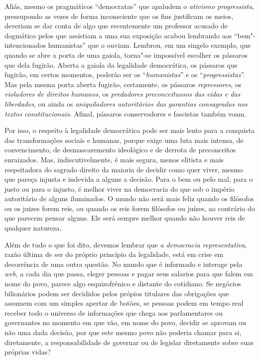 Aliás, mesmo os pragmáticos ``democratas'' que apaludem o \emph{ativismo
progressista,} pressupondo as vezes de forma inconsciente que os fins
justificam os meios, deveriam se dar conta de algo que recentemente um
professor acusado de dogmático pelos que assistiam a uma sua exposição
acabou lembrando aos ``bem"-intencionados humanistas'' que o ouviam.
Lembrou, em um singelo exemplo, que quando se abre a porta de uma
gaiola, torna"-se impossível escolher os pássaros que dela fugirão.
Aberta a gaiola da legalidade democrática, os pássaros que fugirão, em
certos momentos, poderão ser os ``\emph{humanistas}'' e os
``\emph{progressistas}''. Mas pela mesma porta aberta fugirão,
certamente, os pássaros \emph{repressores}, os \emph{violadores de
direitos humanos}, os \emph{predadores preconceituosos das vidas e das
liberdades}, ou ainda os \emph{aniquiladores autoritários das garantias
consagradas nos textos constitucionais}. Afinal, pássaros conservadores
e fascistas também voam.

Por isso, o respeito à legalidade democrática pode ser mais lento para a
conquista das transformações sociais e humanas, porque exige uma luta
mais intensa, de convencimento, de desmascaremento ideológico e de
derrota de preconceitos enraizados. Mas, indiscutivelmente, é mais
segura, menos elitista e mais respeitadora do sagrado direito da maioria
de decidir como quer viver, mesmo que pareça injusta e indevida a alguns
a decisão. Para o bem ou pelo mal, para o justo ou para o injusto, é
melhor viver na democracia do que sob o império autoritário de alguns
iluminados. O mundo não será mais feliz quando os filósofos ou os juizes
forem reis, ou quando os reis forem filósofos ou juízes, ao contrário do
que parecem pensar alguns. Ele será sempre melhor quando não houver reis
de qualquer natureza.

Além de tudo o que foi dito, devemos lembrar que \emph{a democracia
representativa}, razão última de ser do próprio princípio da legalidade,
está em crise em decorrência de uma outra questão. No mundo que é
informado e interage pela \emph{web,} a cada dia que passa, eleger
pessoas e pagar seus salarios para que falem em nome do povo, parece
algo esquizofrênico e distante do cotidiano. Se negócios bilionários
podem ser decididos pelos própios titulares das obrigações que assumem
com um simples apertar de botões, se pessoas podem em tempo real receber
todo o universo de informações que chega aos parlamentares ou
governantes no momento em que vão, em nome do povo, decidir se aprovam
ou não uma dada decisão, por que este mesmo povo não poderia chamar para
si, diretamente, a responsabilidade de governar ou de legislar
diretamente sobre suas próprias vidas?

